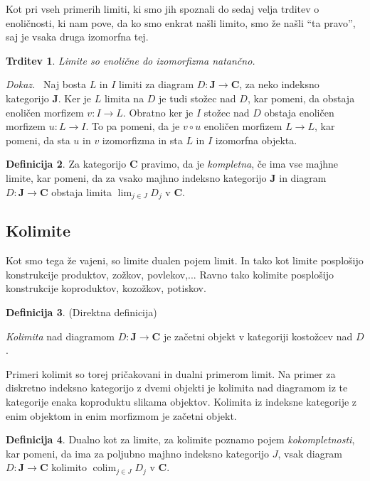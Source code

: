 \documentclass[12pt,a4paper]{book}
\theoremstyle{definition}
\newtheorem{definicija}{Definicija}[chapter]
\theoremstyle{plain}
\newtheorem{trditev}[definicija]{Trditev}
\newenvironment{dokaz}{\emph{Dokaz.}\ }{\hspace{\fill}{$\Box$}}
\theoremstyle{definition}
\theoremstyle{remark}
\newcommand{\cat}[1]{\textbf{#1}}
\DeclareMathOperator{\colim}{colim}
\begin{document}
Kot pri vseh primerih limiti, ki smo jih spoznali do sedaj velja trditev o enoličnosti, ki nam pove, da ko smo enkrat našli limito, smo že našli "`ta pravo"', saj je vsaka druga izomorfna tej.
\begin{trditev}
Limite so enolične do izomorfizma natančno.
\end{trditev}
\begin{dokaz}
Naj bosta $L$ in $I$ limiti za diagram $D : \cat{J} \to \cat{C}$, za neko indeksno kategorijo $\cat{J}$. Ker je $L$ limita na $D$ je tudi stožec nad $D$, kar pomeni, da obstaja enoličen morfizem $v : I \to L$. Obratno ker je $I$ stožec nad $D$ obstaja enoličen morfizem $u : L \to I$. To pa pomeni, da je $v \circ u$ enoličen morfizem $L \to L$, kar pomeni, da sta $u$ in $v$ izomorfizma in sta $L$ in $I$ izomorfna objekta.
\end{dokaz}

\begin{definicija}
Za kategorijo $\cat{C}$ pravimo, da je \emph{kompletna}, če ima vse majhne limite, kar pomeni, da za vsako majhno indeksno kategorijo $\cat{J}$ in diagram $D : \cat{J} \to \cat{C}$ obstaja limita $\lim_{j \in J} D_j$ v $\cat{C}$.
\end{definicija}



\subsection{Kolimite}

Kot smo tega že vajeni, so limite dualen pojem limit. In tako kot limite posplošijo konstrukcije produktov, zožkov, povlekov,... Ravno tako kolimite posplošijo konstrukcije koproduktov, kozožkov, potiskov.

\begin{definicija} (Direktna definicija)

\emph{Kolimita} nad diagramom $D : \cat{J} \to \cat{C}$ je začetni objekt v kategoriji kostožcev nad $D$.
\end{definicija}

Primeri kolimit so torej pričakovani in dualni primerom limit. Na primer za diskretno indeksno kategorijo z dvemi objekti je kolimita nad diagramom iz te kategorije enaka koproduktu slikama objektov. Kolimita iz indeksne kategorije z enim objektom in enim morfizmom je začetni objekt.

\begin{definicija}
Dualno kot za limite, za kolimite poznamo pojem \emph{kokompletnosti}, kar pomeni, da ima za poljubno majhno indeksno kategorijo $J$, vsak diagram $D : \cat{J} \to \cat{C}$ kolimito $\colim_{j \in J} D_j$ v $\cat{C}$.
\end{definicija}
\end{document}
